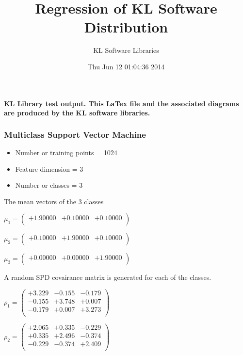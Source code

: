 \documentclass[9pt]{article}
\theoremstyle{plain}
\theoremstyle{definition}
\theoremstyle{remark}
\numberwithin{equation}{section}
\begin{document}
\title{Regression of KL Software Distribution   }
\author{KL Software Libraries}
\date{Thu Jun 12 01:04:36 2014
}
\maketitle
\textbf{ KL Library test output.  This LaTex file and the associated diagrams are produced by the KL software libraries.}
\subsubsection{Multiclass Support Vector Machine }
\begin{itemize}
\item Number or training points = 1024
\item Feature dimension = 3
\item Number or classes = 3
\end{itemize}
{The mean vectors of the 3 classes}

$\mu_1 = \left(
\begin{array}{
ccc}
+1.90000 & +0.10000 & +0.10000 \\
\end{array}
\right)$ \newline 

$\mu_2 = \left(
\begin{array}{
ccc}
+0.10000 & +1.90000 & +0.10000 \\
\end{array}
\right)$ \newline 

$\mu_3 = \left(
\begin{array}{
ccc}
+0.00000 & +0.00000 & +1.90000 \\
\end{array}
\right)$ \newline 

A random SPD covairance matrix is generated for each of the classes.\newline

$\rho_1 = \left(
\begin{array}{
ccc}
+3.229 & -0.155 & -0.179 \\
-0.155 & +3.748 & +0.007 \\
-0.179 & +0.007 & +3.273 \\
\end{array}
\right)$ \newline 

$\rho_2 = \left(
\begin{array}{
ccc}
+2.065 & +0.335 & -0.229 \\
+0.335 & +2.496 & -0.374 \\
-0.229 & -0.374 & +2.409 \\
\end{array}
\right)$ \newline 
\end{document}
